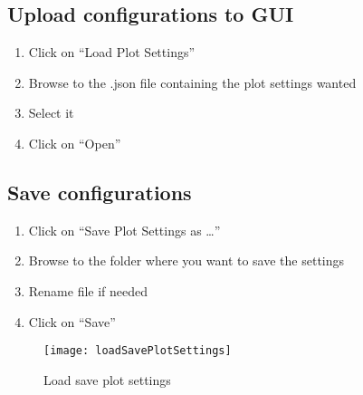 \documentclass[fadttsterUserGuide_master]{subfiles}
\begin{document}
	\subsection{Upload configurations to GUI}
	\begin{enumerate}
		\item Click on ``Load Plot Settings''
		\item Browse to the .json file containing the plot settings wanted
		\item Select it
		\item Click on ``Open''
	\end{enumerate}
	
	\subsection{Save configurations}
	\begin{enumerate}
		\item Click on ``Save Plot Settings as \ldots ''
		\item Browse to the folder where you want to save the settings
		\item Rename file if needed
		\item Click on ``Save''
	\end{enumerate}
	
	\begin{figure}[H]
		\centering
		\texttt{[image: loadSavePlotSettings]}
		\caption{Load save plot settings}
		\label{fig:loadSavePlotSettings}
	\end{figure}
	\vfill
    \newpage
	
\end{document}
